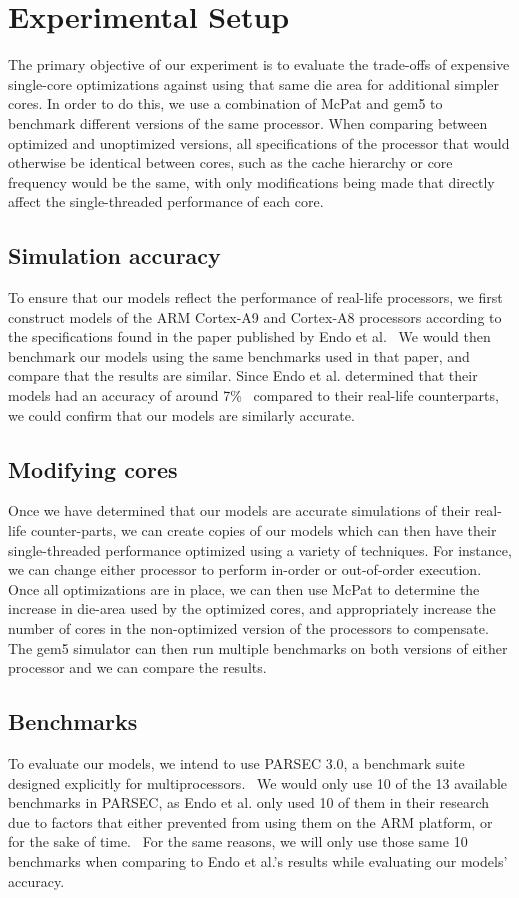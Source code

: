 \documentclass[conference,9pt]{IEEEtran}
\begin{document}
\section{Experimental Setup}
The primary objective of our experiment is to evaluate the trade-offs of expensive single-core optimizations against using that same die area for additional simpler cores. In order to do this, we use a combination of McPat and gem5 to benchmark different versions of the same processor. When comparing between optimized and unoptimized versions, all specifications of the processor that would otherwise be identical between cores, such as the cache hierarchy or core frequency would be the same, with only modifications being made that directly affect the single-threaded performance of each core.

\subsection{Simulation accuracy}
To ensure that our models reflect the performance of real-life processors, we first construct models of the ARM Cortex-A9 and Cortex-A8 processors according to the specifications found in the paper published by Endo et al.~\cite{6893220} We would then benchmark our models using the same benchmarks used in that paper, and compare that the results are similar. Since Endo et al. determined that their models had an accuracy of around 7\%~\cite{6893220} compared to their real-life counterparts, we could confirm that our models are similarly accurate.

\subsection{Modifying cores}
Once we have determined that our models are accurate simulations of their real-life counter-parts, we can create copies of our models which can then have their single-threaded performance optimized using a variety of techniques. For instance, we can change either processor to perform in-order or out-of-order execution. Once all optimizations are in place, we can then use McPat to determine the increase in die-area used by the optimized cores, and appropriately increase the number of cores in the non-optimized version of the processors to compensate. The gem5 simulator can then run multiple benchmarks on both versions of either processor and we can compare the results.

\subsection{Benchmarks}
\label{sec:bench}
To evaluate our models, we intend to use PARSEC 3.0, a benchmark suite designed explicitly for multiprocessors.~\cite{Bienia2011} We would only use 10 of the 13 available benchmarks in PARSEC, as Endo et al. only used 10 of them in their research due to factors that either prevented from using them on the ARM platform, or for the sake of time.~\cite{6893220} For the same reasons, we will only use those same 10 benchmarks when comparing to Endo et al.'s results while evaluating our models' accuracy.
\end{document}
